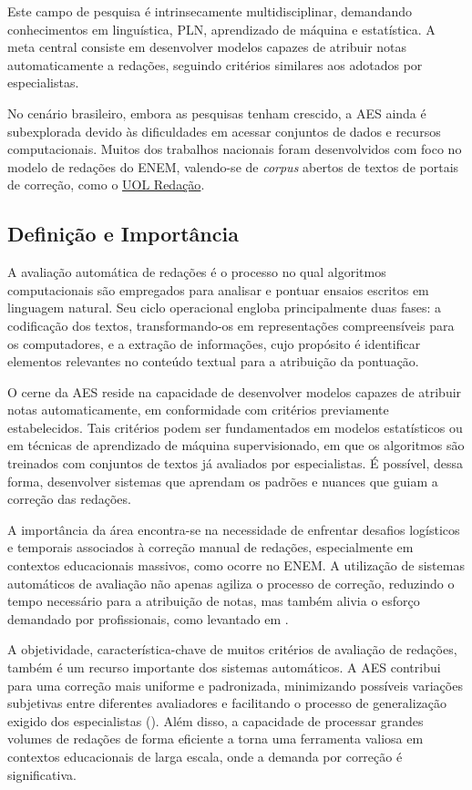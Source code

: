 Este campo de pesquisa é intrinsecamente multidisciplinar, demandando conhecimentos em linguística, PLN, aprendizado de máquina e estatística. A meta central consiste em desenvolver modelos capazes de atribuir notas automaticamente a redações, seguindo critérios similares aos adotados por especialistas.

No cenário brasileiro, embora as pesquisas tenham crescido, a AES ainda é subexplorada devido às dificuldades em acessar conjuntos de dados e recursos computacionais. Muitos dos trabalhos nacionais foram desenvolvidos com foco no modelo de redações do ENEM, valendo-se de \textit{corpus} abertos de textos de portais de correção, como o \href{https://educacao.uol.com.br/bancoderedacoes/}{UOL Redação}.

\subsection{Definição e Importância}

A avaliação automática de redações é o processo no qual algoritmos computacionais são empregados para analisar e pontuar ensaios escritos em linguagem natural. Seu ciclo operacional engloba principalmente duas fases: a codificação dos textos, transformando-os em representações compreensíveis para os computadores, e a extração de informações, cujo propósito é identificar elementos relevantes no conteúdo textual para a atribuição da pontuação.

O cerne da AES reside na capacidade de desenvolver modelos capazes de atribuir notas automaticamente, em conformidade com critérios previamente estabelecidos. Tais critérios podem ser fundamentados em modelos estatísticos ou em técnicas de aprendizado de máquina supervisionado, em que os algoritmos são treinados com conjuntos de textos já avaliados por especialistas. É possível, dessa forma, desenvolver sistemas que aprendam os padrões e nuances que guiam a correção das redações.

A importância da área encontra-se na necessidade de enfrentar desafios logísticos e temporais associados à correção manual de redações, especialmente em contextos educacionais massivos, como ocorre no ENEM. A utilização de sistemas automáticos de avaliação não apenas agiliza o processo de correção, reduzindo o tempo necessário para a atribuição de notas, mas também alivia o esforço demandado por profissionais, como levantado em \cite{costa-et-al-2020}.

A objetividade, característica-chave de muitos critérios de avaliação de redações, também é um recurso importante dos sistemas automáticos. A AES contribui para uma correção mais uniforme e padronizada, minimizando possíveis variações subjetivas entre diferentes avaliadores e facilitando o processo de generalização exigido dos especialistas (\cite{myers-2003}). Além disso, a capacidade de processar grandes volumes de redações de forma eficiente a torna uma ferramenta valiosa em contextos educacionais de larga escala, onde a demanda por correção é significativa.

